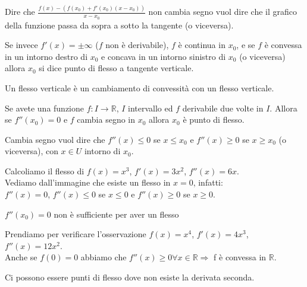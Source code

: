 \hspace{-15pt}Dire che $\frac{f(x) - (f(x_0) + f'(x_0)(x-x_0))}{x-x_0}$ non cambia segno vuol dire che il grafico della funzione passa da sopra a sotto la tangente (o viceversa).

\begin{definition}
Se invece $f'(x) = \pm\infty$ ($f$ non è derivabile), $f$ è continua in $x_0$, e se $f$ è convessa in un intorno destro di $x_0$ e concava in un intorno sinistro di $x_0$ (o viceversa) allora $x_0$ si dice punto di flesso a tangente verticale. 
\end{definition}

\hspace{-15pt}Un flesso verticale è un cambiamento di convessità con un flesso verticale.

\begin{observation}
Se avete una funzione $f: I \to \mathbb{R}$, $I$ intervallo ed $f$ derivabile due volte in $I$. Allora se $f''(x_0)=0$ e $f$ cambia segno in $x_0$ allora $x_0$ è punto di flesso.
\end{observation}

\hspace{-15pt}Cambia segno vuol dire che $f''(x) \leq 0$ se $x\leq x_0$ e $f''(x) \geq 0$ se $x\geq x_0$ (o viceversa), con $x \in U$ intorno di $x_0$.

\begin{example}
Calcoliamo il flesso di $f(x) = x^3$, $f'(x) = 3x^2$, $f''(x) =6x$.\\
Vediamo dall'immagine che esiste un flesso in $x=0$, infatti:\\
$f''(x) = 0$, $f''(x) \leq 0$ se $x \leq 0$ e $f''(x) \geq 0$ se $x \geq 0$.
\end{example}

\begin{observation}
$f''(x_0) = 0$ non è sufficiente per aver un flesso
\end{observation}

\begin{example}
Prendiamo per verificare l'osservazione $f(x) = x^4$, $f'(x) = 4x^3$, $f''(x) = 12x^2$.\\
Anche se $f(0)=0$ abbiamo che $f''(x) \geq 0 \forall x \in \mathbb{R} \Longrightarrow $ f è convessa in $\mathbb{R}$.
\end{example}

\begin{observation}
Ci possono essere punti di flesso dove non esiste la derivata seconda.
\end{observation}

